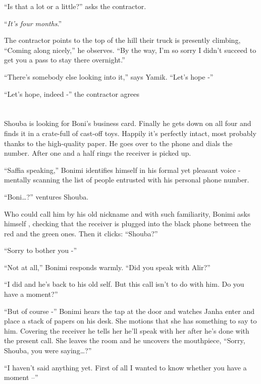 \documentclass[twoside,11pt]{book}
\begin{document}
``Is that a lot or a little?'' asks the contractor.

``\textit{It's four months}.''

The contractor points to the top of the hill their truck is presently climbing, ``Coming along nicely,'' he
observes. ``By the way, I'm so sorry I didn't succeed to get you a pass to stay there overnight.''

``There's somebody else looking into it,'' says Yamik. ``Let's hope
-''

``Let's hope, indeed -'' the contractor agrees


\bigskip

\chapter{}

Shouba is looking for Boni's business card. Finally he gets down on all four and finds it in a crate-full of cast-off
toys. Happily it's perfectly intact, most probably thanks to the high-quality paper. He goes over to the phone and
dials the number. After one and a half rings the receiver is picked up.

``Saffia speaking,'' Bonimi identifies himself in his formal yet pleasant voice - mentally
scanning the list of people entrusted with his personal phone number.

``Boni{\dots}?'' ventures Shouba.

Who could call him by his old nickname and with such familiarity, Bonimi asks himself , checking that the receiver is
plugged into the black phone between the red and the green ones. Then it clicks: ``Shouba?''

``Sorry to bother you -''

``Not at all,'' Bonimi responds warmly. ``Did you speak with Alir?''

``I did and he's back to his old self. But this call isn't to do with him. Do you have a
moment?''

``But of course -'' Bonimi hears the tap at the door and watches Janha enter and place a stack
of papers on his desk. She motions that she has something to say to him. Covering the receiver he tells her he'll speak
with her after he's done with the present call. She leaves the room and he uncovers the mouthpiece,
``Sorry, Shouba, you were saying{\dots}?''

``I haven't said anything yet. First of all I wanted to know whether you have a moment --''
\end{document}
